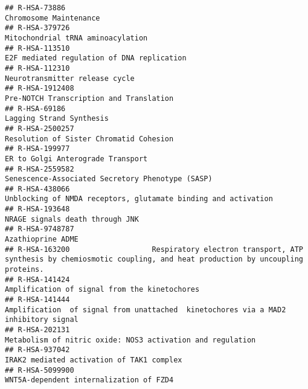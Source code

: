 \documentclass[
]{article}
\begin{document}
\begin{verbatim}
## R-HSA-73886                                                                                                                 Chromosome Maintenance
## R-HSA-379726                                                                                                     Mitochondrial tRNA aminoacylation
## R-HSA-113510                                                                                            E2F mediated regulation of DNA replication
## R-HSA-112310                                                                                                        Neurotransmitter release cycle
## R-HSA-1912408                                                                                              Pre-NOTCH Transcription and Translation
## R-HSA-69186                                                                                                               Lagging Strand Synthesis
## R-HSA-2500257                                                                                              Resolution of Sister Chromatid Cohesion
## R-HSA-199977                                                                                                     ER to Golgi Anterograde Transport
## R-HSA-2559582                                                                                     Senescence-Associated Secretory Phenotype (SASP)
## R-HSA-438066                                                                        Unblocking of NMDA receptors, glutamate binding and activation
## R-HSA-193648                                                                                                       NRAGE signals death through JNK
## R-HSA-9748787                                                                                                                    Azathioprine ADME
## R-HSA-163200                   Respiratory electron transport, ATP synthesis by chemiosmotic coupling, and heat production by uncoupling proteins.
## R-HSA-141424                                                                                         Amplification of signal from the kinetochores
## R-HSA-141444                                                  Amplification  of signal from unattached  kinetochores via a MAD2  inhibitory signal
## R-HSA-202131                                                                            Metabolism of nitric oxide: NOS3 activation and regulation
## R-HSA-937042                                                                                             IRAK2 mediated activation of TAK1 complex
## R-HSA-5099900                                                                                              WNT5A-dependent internalization of FZD4

\end{verbatim}
\end{document}
